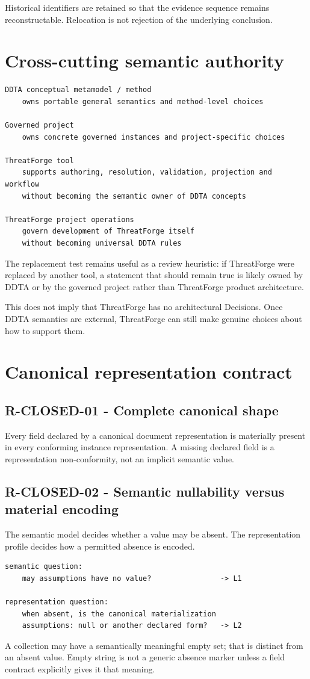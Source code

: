 \documentclass[11pt,a4paper]{article}
\begin{document}
Historical identifiers are retained so that the evidence sequence remains reconstructable. Relocation is not rejection of the underlying conclusion.

\section{Cross-cutting semantic authority}
\begin{verbatim}
DDTA conceptual metamodel / method
    owns portable general semantics and method-level choices

Governed project
    owns concrete governed instances and project-specific choices

ThreatForge tool
    supports authoring, resolution, validation, projection and workflow
    without becoming the semantic owner of DDTA concepts

ThreatForge project operations
    govern development of ThreatForge itself
    without becoming universal DDTA rules
\end{verbatim}
The replacement test remains useful as a review heuristic: if ThreatForge were replaced by another tool, a statement that should remain true is likely owned by DDTA or by the governed project rather than ThreatForge product architecture.

This does not imply that ThreatForge has no architectural Decisions. Once DDTA semantics are external, ThreatForge can still make genuine choices about how to support them.

\section{Canonical representation contract}
\subsection*{R-CLOSED-01 - Complete canonical shape}
Every field declared by a canonical document representation is materially present in every conforming instance representation. A missing declared field is a representation non-conformity, not an implicit semantic value.

\subsection*{R-CLOSED-02 - Semantic nullability versus material encoding}
The semantic model decides whether a value may be absent. The representation profile decides how a permitted absence is encoded.
\begin{verbatim}
semantic question:
    may assumptions have no value?                -> L1

representation question:
    when absent, is the canonical materialization
    assumptions: null or another declared form?   -> L2
\end{verbatim}
A collection may have a semantically meaningful empty set; that is distinct from an absent value. Empty string is not a generic absence marker unless a field contract explicitly gives it that meaning.
\end{document}
